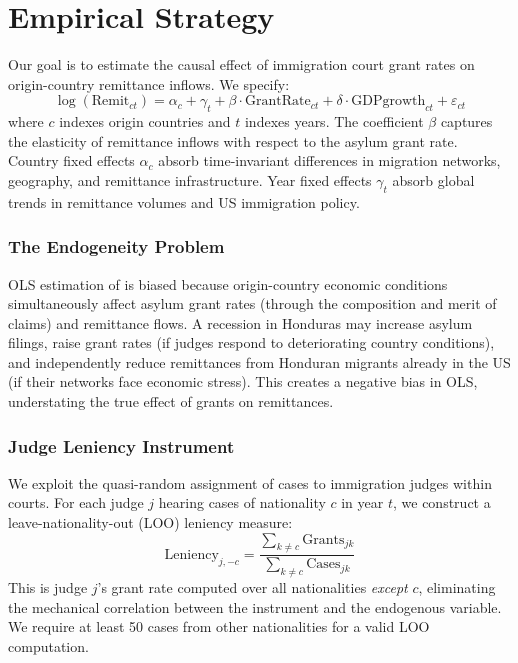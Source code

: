 \documentclass[12pt]{article}
\begin{document}
\section{Empirical Strategy}

Our goal is to estimate the causal effect of immigration court grant rates on origin-country remittance inflows. We specify:
\begin{equation}
\log(\text{Remit}_{ct}) = \alpha_c + \gamma_t + \beta \cdot \text{GrantRate}_{ct} + \delta \cdot \text{GDPgrowth}_{ct} + \varepsilon_{ct}
\label{eq:main}
\end{equation}
where $c$ indexes origin countries and $t$ indexes years. The coefficient $\beta$ captures the elasticity of remittance inflows with respect to the asylum grant rate. Country fixed effects $\alpha_c$ absorb time-invariant differences in migration networks, geography, and remittance infrastructure. Year fixed effects $\gamma_t$ absorb global trends in remittance volumes and US immigration policy.

\subsubsection*{The Endogeneity Problem} OLS estimation of  is biased because origin-country economic conditions simultaneously affect asylum grant rates (through the composition and merit of claims) and remittance flows. A recession in Honduras may increase asylum filings, raise grant rates (if judges respond to deteriorating country conditions), and independently reduce remittances from Honduran migrants already in the US (if their networks face economic stress). This creates a negative bias in OLS, understating the true effect of grants on remittances.

\subsubsection*{Judge Leniency Instrument} We exploit the quasi-random assignment of cases to immigration judges within courts. For each judge $j$ hearing cases of nationality $c$ in year $t$, we construct a leave-nationality-out (LOO) leniency measure:
\begin{equation}
\text{Leniency}_{j,-c} = \frac{\sum_{k \neq c} \text{Grants}_{jk}}{\sum_{k \neq c} \text{Cases}_{jk}}
\label{eq:loo}
\end{equation}
This is judge $j$'s grant rate computed over all nationalities \emph{except} $c$, eliminating the mechanical correlation between the instrument and the endogenous variable. We require at least 50 cases from other nationalities for a valid LOO computation.
\end{document}
